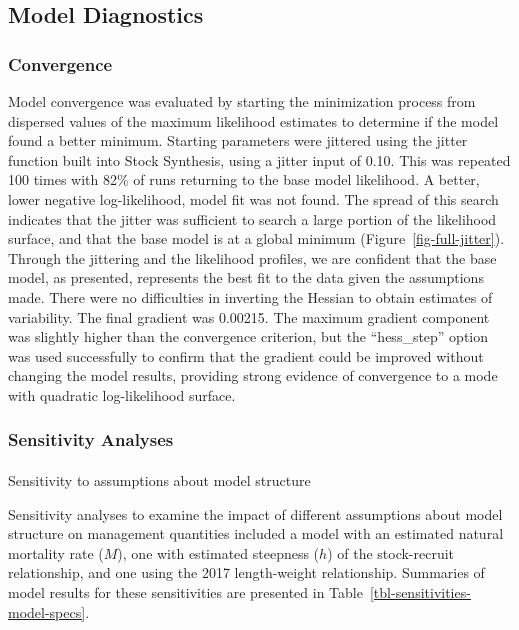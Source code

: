 \documentclass[
]{scrartcl}
\makeatletter
\let\oldparagraph\paragraph
\renewcommand{\paragraph}{
    \@ifstar
      \xxxParagraphStar
      \xxxParagraphNoStar
  }
\newcommand{\xxxParagraphStar}[1]{\oldparagraph*{#1}\mbox{}}
\newcommand{\xxxParagraphNoStar}[1]{\oldparagraph{#1}\mbox{}}
\makeatother
\begin{document}
\subsection{Model Diagnostics}\label{model-diagnostics}

\subsubsection{Convergence}\label{convergence}

Model convergence was evaluated by starting the minimization process
from dispersed values of the maximum likelihood estimates to determine
if the model found a better minimum. Starting parameters were jittered
using the jitter function built into Stock Synthesis, using a jitter
input of 0.10. This was repeated 100 times with 82\% of runs returning
to the base model likelihood. A better, lower negative log-likelihood,
model fit was not found. The spread of this search indicates that the
jitter was sufficient to search a large portion of the likelihood
surface, and that the base model is at a global minimum
(Figure~\ref{fig-full-jitter}). Through the jittering and the likelihood
profiles, we are confident that the base model, as presented, represents
the best fit to the data given the assumptions made. There were no
difficulties in inverting the Hessian to obtain estimates of
variability. The final gradient was 0.00215. The maximum gradient
component was slightly higher than the convergence criterion, but the
``hess\_step'' option was used successfully to confirm that the gradient
could be improved without changing the model results, providing strong
evidence of convergence to a mode with quadratic log-likelihood surface.

\subsubsection{Sensitivity Analyses}\label{sensitivity-analyses}

\paragraph{Sensitivity to assumptions about model
structure}\label{sensitivity-to-assumptions-about-model-structure}

Sensitivity analyses to examine the impact of different assumptions
about model structure on management quantities included a model with an
estimated natural mortality rate (\(M\)), one with estimated steepness
(\(h\)) of the stock-recruit relationship, and one using the 2017
length-weight relationship. Summaries of model results for these
sensitivities are presented in
Table~\ref{tbl-sensitivities-model-specs}.
\end{document}
